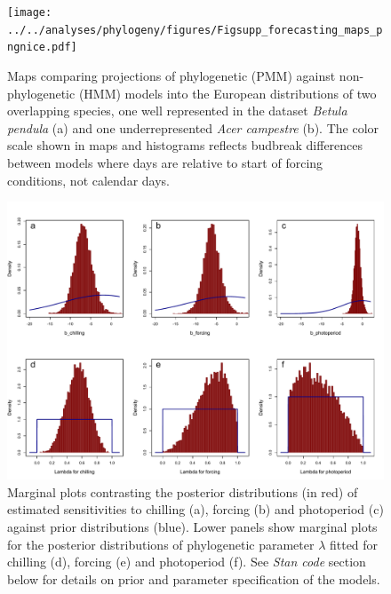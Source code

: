 \documentclass[11pt]{article}
\begin{document}
\clearpage
\begin{figure}
  \begin{center}
  \texttt{[image: ../../analyses/phylogeny/figures/Figsupp\_forecasting\_maps\_pngnice.pdf]}
  \caption{Maps comparing projections of phylogenetic (PMM) against non-phylogenetic (HMM) models into the European distributions of two overlapping species, one well represented in the dataset \emph{Betula pendula} (a) and one underrepresented \emph{Acer campestre} (b). The color scale shown in maps and histograms reflects budbreak differences between models where days are relative to start of forcing conditions, not calendar days.}
  \label{fig:pmmvshmm}
  \end{center}
\end{figure}


\clearpage
\begin{figure}
  \begin{center}
  \includegraphics[width=14cm]{../../analyses/phylogeny/figures/FigSXX_marginal_plots_betas_lambda.pdf}
  \caption{Marginal plots contrasting the posterior distributions (in red) of estimated sensitivities to chilling (a), forcing (b) and photoperiod (c) against prior distributions (blue). Lower panels show marginal plots for the posterior distributions of phylogenetic parameter $\lambda$ fitted for chilling (d), forcing (e) and photoperiod (f). See \emph{Stan code} section below for details on prior and parameter specification of the models.}
  \label{fig:marginalplots}
  \end{center}
\end{figure}
\end{document}
